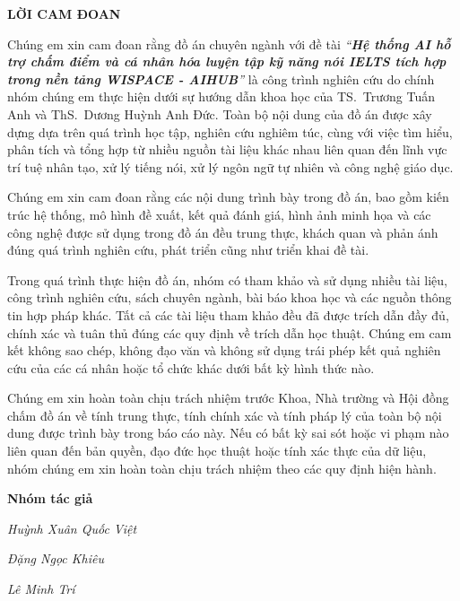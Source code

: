 \newpage
\begin{center}
    \textbf{\Large LỜI CAM ĐOAN}
\end{center}

Chúng em xin cam đoan rằng đồ án chuyên ngành với đề tài 
\textit{``\textbf{Hệ thống AI hỗ trợ chấm điểm và cá nhân hóa luyện tập kỹ năng nói IELTS tích hợp trong nền tảng WISPACE - AIHUB}''}
là công trình nghiên cứu do chính nhóm chúng em thực hiện dưới sự hướng dẫn khoa học của TS.~Trương Tuấn Anh và ThS.~Dương Huỳnh Anh Đức.
Toàn bộ nội dung của đồ án được xây dựng dựa trên quá trình học tập, nghiên cứu nghiêm túc, cùng với việc tìm hiểu, phân tích và tổng hợp từ nhiều nguồn tài liệu khác nhau liên quan đến lĩnh vực trí tuệ nhân tạo, xử lý tiếng nói, xử lý ngôn ngữ tự nhiên và công nghệ giáo dục.

Chúng em xin cam đoan rằng các nội dung trình bày trong đồ án, bao gồm kiến trúc hệ thống, mô hình đề xuất, kết quả đánh giá, hình ảnh minh họa và các công nghệ được sử dụng trong đồ án đều trung thực, khách quan và phản ánh đúng quá trình nghiên cứu, phát triển cũng như triển khai đề tài.

Trong quá trình thực hiện đồ án, nhóm có tham khảo và sử dụng nhiều tài liệu, công trình nghiên cứu, sách chuyên ngành, bài báo khoa học và các nguồn thông tin hợp pháp khác. Tất cả các tài liệu tham khảo đều đã được trích dẫn đầy đủ, chính xác và tuân thủ đúng các quy định về trích dẫn học thuật. Chúng em cam kết không sao chép, không đạo văn và không sử dụng trái phép kết quả nghiên cứu của các cá nhân hoặc tổ chức khác dưới bất kỳ hình thức nào.

Chúng em xin hoàn toàn chịu trách nhiệm trước Khoa, Nhà trường và Hội đồng chấm đồ án về tính trung thực, tính chính xác và tính pháp lý của toàn bộ nội dung được trình bày trong báo cáo này. Nếu có bất kỳ sai sót hoặc vi phạm nào liên quan đến bản quyền, đạo đức học thuật hoặc tính xác thực của dữ liệu, nhóm chúng em xin hoàn toàn chịu trách nhiệm theo các quy định hiện hành.

\vspace{1cm}

\par\hfill\textbf{Nhóm tác giả}

\par\hfill\textit{Huỳnh Xuân Quốc Việt}

\par\hfill\textit{Đặng Ngọc Khiêu}

\par\hfill\textit{Lê Minh Trí}
\newpage
